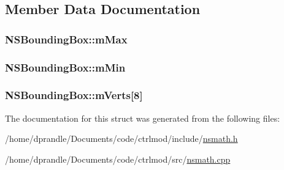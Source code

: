 \subsection{Member Data Documentation}
\hypertarget{structNSBoundingBox_a88e4cabc207b0d661f9b86070914b62e}{
\subsubsection[{m\-Max}]{ N\-S\-Bounding\-Box\-::m\-Max}}\label{structNSBoundingBox_a88e4cabc207b0d661f9b86070914b62e}
\hypertarget{structNSBoundingBox_ad23e224abed3b35fe44447404eff6021}{
\subsubsection[{m\-Min}]{ N\-S\-Bounding\-Box\-::m\-Min}}\label{structNSBoundingBox_ad23e224abed3b35fe44447404eff6021}
\hypertarget{structNSBoundingBox_a997316efc636f9f346c1ecbc1bf9288a}{
\subsubsection[{m\-Verts}]{ N\-S\-Bounding\-Box\-::m\-Verts\mbox{[}8\mbox{]}}}\label{structNSBoundingBox_a997316efc636f9f346c1ecbc1bf9288a}


The documentation for this struct was generated from the following files\-:\begin{DoxyCompactItemize}
\item 
/home/dprandle/\-Documents/code/ctrlmod/include/\hyperlink{nsmath_8h}{nsmath.\-h}\item 
/home/dprandle/\-Documents/code/ctrlmod/src/\hyperlink{nsmath_8cpp}{nsmath.\-cpp}\end{DoxyCompactItemize}
